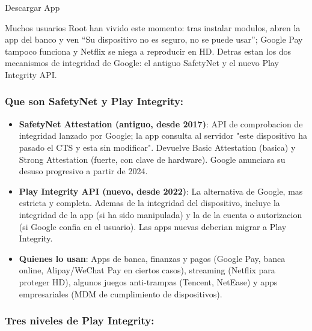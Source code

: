 Descargar App


Muchos usuarios Root han vivido este momento: tras instalar modulos, abren la app del banco y ven “Su dispositivo no es seguro, no se puede usar”; Google Pay tampoco funciona y Netflix se niega a reproducir en HD. Detras estan los dos mecanismos de integridad de Google: el antiguo SafetyNet y el nuevo Play Integrity API.

\subsubsection*{Que son SafetyNet y Play Integrity:}

\begin{itemize}
  \item \textbf{SafetyNet Attestation (antiguo, desde 2017)}: API de comprobacion de integridad lanzado por Google; la app consulta al servidor "este dispositivo ha pasado el CTS y esta sin modificar". Devuelve Basic Attestation (basica) y Strong Attestation (fuerte, con clave de hardware). Google anunciara su desuso progresivo a partir de 2024.
  \item \textbf{Play Integrity API (nuevo, desde 2022)}: La alternativa de Google, mas estricta y completa. Ademas de la integridad del dispositivo, incluye la integridad de la app (si ha sido manipulada) y la de la cuenta o autorizacion (si Google confia en el usuario). Las apps nuevas deberian migrar a Play Integrity.
  \item \textbf{Quienes lo usan}: Apps de banca, finanzas y pagos (Google Pay, banca online, Alipay/WeChat Pay en ciertos casos), streaming (Netflix para proteger HD), algunos juegos anti-trampas (Tencent, NetEase) y apps empresariales (MDM de cumplimiento de dispositivos).
\end{itemize}

\subsubsection*{Tres niveles de Play Integrity:}

